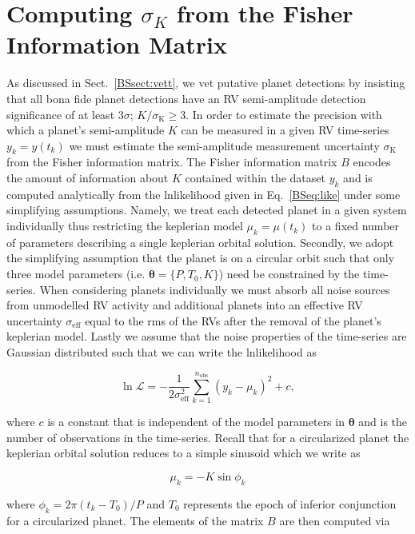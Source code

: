 \section{Computing $\sigma_K$ from the Fisher Information Matrix} \label{app:fisher}
As discussed in Sect.~\ref{BSsect:vett}, we vet putative planet detections by insisting that
all bona fide planet detections have an RV semi-amplitude detection significance of at least
$3\sigma$; $K/\sigma_{\text{K}} \geq 3$. 
In order to estimate the precision with which a planet's semi-amplitude $K$ can be measured 
in a given RV time-series $y_k=y(t_k)$ we must estimate the semi-amplitude measurement
uncertainty $\sigma_{\text{K}}$ from the Fisher information matrix. The Fisher information matrix $B$
encodes the amount of information about $K$ contained within the dataset $y_k$ and is computed
analytically
from the lnlikelihood given in Eq.~\ref{BSeq:like} under some simplifying assumptions. Namely,
we treat each detected planet in a given system individually thus restricting the keplerian
model $\mu_k=\mu(t_k)$ to a fixed number of parameters describing a single keplerian orbital
solution. Secondly, we adopt the simplifying assumption that the planet is on a circular
orbit such that only three model parameters (i.e. $\boldsymbol{\theta}=\{P,T_0,K\}$) need be
constrained by the time-series. When considering planets individually we
must absorb all noise sources from unmodelled RV activity and additional planets
into an effective RV uncertainty $\sigma_{\text{eff}}$ equal to the rms of the RVs after the
removal of the planet's keplerian model. Lastly we assume that the noise properties of the
time-series are Gaussian distributed such that we can write the lnlikelihood as

\begin{equation}
  \ln{\mathcal{L}} = -\frac{1}{2\sigma_{\text{eff}}^2} \sum_{k=1}^{n_{\text{obs}}} (y_k - \mu_k)^2 + c, \label{BSeq:ll2}
\end{equation}

\noindent where $c$ is a constant that is independent of the model parameters in $\boldsymbol{\theta}$
and \nobs{} is the number of observations in the time-series.
Recall that for a circularized planet the keplerian orbital solution reduces to a simple sinusoid which
we write as

\begin{equation}
  \mu_k = -K \sin{\phi_k} \label{BSeq:kep}
\end{equation}

\noindent where $\phi_k = 2\pi (t_k-T_0) / P$ and $T_0$ represents the epoch of inferior
conjunction for a circularized planet. The elements of the matrix $B$ are then computed via

